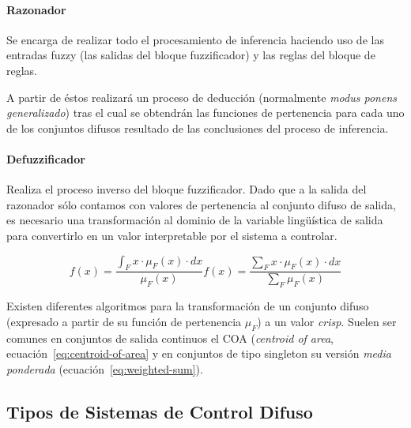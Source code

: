\paragraph{Razonador}

Se encarga de realizar todo el procesamiento de inferencia haciendo uso de las entradas fuzzy (las salidas del bloque fuzzificador) y las reglas del bloque de reglas.

A partir de éstos realizará un proceso de deducción (normalmente \textit{modus ponens generalizado}) tras el cual se obtendrán las funciones de pertenencia para cada uno de los conjuntos difusos resultado de las conclusiones del proceso de inferencia.

\paragraph{Defuzzificador}

Realiza el proceso inverso del bloque fuzzificador. Dado que a la salida del razonador sólo contamos con valores de pertenencia al conjunto difuso de salida, es necesario una transformación al dominio de la variable lingüística de salida para convertirlo en un valor interpretable por el sistema a controlar.

\begin{subequations}
	\begin{equation}
		f(x) = \frac{\int_{F} x \cdot \mu_F(x) \cdot dx}{\mu_F(x)}
		\label{eq:centroid-of-area}
	\end{equation}
	\begin{equation}
		f(x) = \frac{\sum_{F} x \cdot \mu_F(x) \cdot dx}{\sum_{F} \mu_F(x)}
		\label{eq:weighted-sum}
	\end{equation}
\end{subequations}

Existen diferentes algoritmos para la transformación de un conjunto difuso (expresado a partir de su función de pertenencia $\mu_F$) a un valor \textit{crisp}. Suelen ser comunes en conjuntos de salida continuos el COA (\textit{centroid of area}, ecuación~\ref{eq:centroid-of-area} y en conjuntos de tipo singleton su versión \textit{media ponderada} (ecuación~\ref{eq:weighted-sum}).

\subsection{Tipos de Sistemas de Control Difuso}


